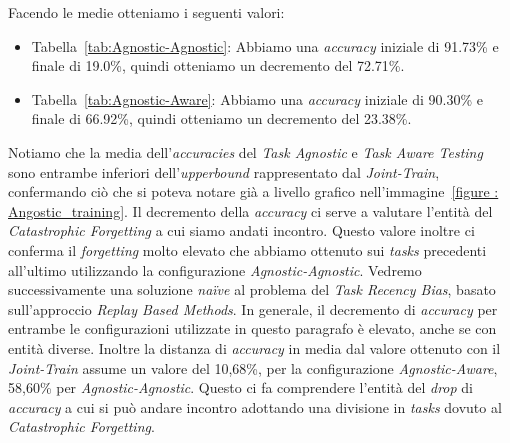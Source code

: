 \newline
Facendo le medie otteniamo i seguenti valori:
\begin{itemize}
    \item Tabella~\ref{tab:Agnostic-Agnostic}: Abbiamo una \textit{accuracy} iniziale di 91.73\% e finale di 19.0\%, quindi otteniamo un decremento del 72.71\%.
    \item Tabella~\ref{tab:Agnostic-Aware}: Abbiamo una \textit{accuracy} iniziale di 90.30\% e finale di 66.92\%, quindi otteniamo un decremento del 23.38\%.
\end{itemize}
Notiamo che la media dell'\textit{accuracies} del \textit{Task Agnostic} e \textit{Task Aware Testing} sono entrambe inferiori dell'\textit{upperbound} rappresentato dal \textit{Joint-Train}, confermando ciò che si poteva notare già a livello grafico nell'immagine~\ref{figure : Angostic_training}.
Il decremento della \textit{accuracy} ci serve a valutare l'entità del \textit{Catastrophic Forgetting} a cui siamo andati incontro.
\newline
Questo valore inoltre ci conferma il \textit{forgetting} molto elevato che abbiamo ottenuto sui \textit{tasks} precedenti all'ultimo  utilizzando la configurazione \textit{Agnostic-Agnostic}. Vedremo successivamente una soluzione \textit{naïve} al problema del \textit{Task Recency Bias}, basato sull'approccio \textit{Replay Based Methods}.
\newline
In generale, il decremento di \textit{accuracy} per entrambe le configurazioni utilizzate in questo paragrafo è elevato, anche se con entità diverse. Inoltre la distanza di \textit{accuracy} in media dal valore ottenuto con il \textit{Joint-Train} assume un valore del 10,68\%, per la configurazione \textit{Agnostic-Aware}, 58,60\% per \textit{Agnostic-Agnostic}. Questo ci fa comprendere l'entità del \textit{drop} di \textit{accuracy} a cui si può andare incontro adottando una divisione in \textit{tasks} dovuto al \textit{Catastrophic Forgetting}.
